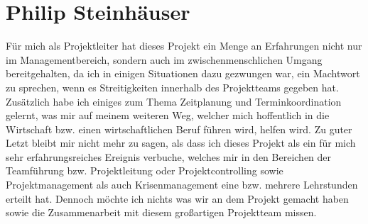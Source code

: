 \section{Philip Steinhäuser}
Für mich als Projektleiter hat dieses Projekt ein Menge an Erfahrungen nicht nur im Managementbereich, sondern auch im zwischenmenschlichen Umgang bereitgehalten, da ich in einigen Situationen dazu gezwungen war, ein Machtwort zu sprechen, wenn es Streitigkeiten innerhalb des Projektteams gegeben hat. Zusätzlich habe ich einiges zum Thema Zeitplanung und Terminkoordination gelernt, was mir auf meinem weiteren Weg, welcher mich hoffentlich in die Wirtschaft bzw. einen wirtschaftlichen Beruf führen wird, helfen wird. Zu guter Letzt bleibt mir nicht mehr zu sagen, als dass ich dieses Projekt als ein für mich sehr erfahrungsreiches Ereignis verbuche, welches mir in den Bereichen der Teamführung bzw. Projektleitung oder Projektcontrolling sowie Projektmanagement als auch Krisenmanagement eine bzw. mehrere Lehrstunden erteilt hat. Dennoch möchte ich nichts was wir an dem Projekt gemacht haben sowie die Zusammenarbeit mit diesem großartigen Projektteam missen.